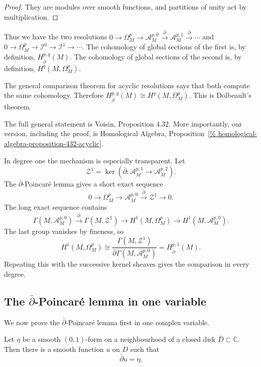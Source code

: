 \begin{proof}
They are modules over smooth functions, and
partitions of unity act by multiplication.
\end{proof}

Thus we have the two resolutions
$
0\longrightarrow\Omega^p_M
\longrightarrow\mathcal A^{p,0}_M
\xrightarrow{\bar\partial}
\mathcal A^{p,1}_M
\xrightarrow{\bar\partial}\cdots
$
and
$
0\longrightarrow\Omega^p_M
\longrightarrow\mathcal I^0
\longrightarrow\mathcal I^1
\longrightarrow\cdots.
$
The cohomology of global sections of the
first is, by definition,
$H^{p,q}_{\bar\partial}(M)$.
The cohomology of global sections of the
second is, by definition,
$H^q(M,\Omega^p_M)$.

The general comparison theorem for acyclic
resolutions says that both compute the same
cohomology. Therefore
$
H^{p,q}_{\bar\partial}(M)
\cong
H^q(M,\Omega^p_M).
$
This is Dolbeault's theorem.

The full general statement is Voisin,
Proposition 4.32. More importantly, our
version, including the proof, is Homological
Algebra, Proposition~\ref{%
homological-algebra-proposition-432-acyclic}.

In degree one the mechanism is especially
transparent. Let
$$
\mathcal Z^1
=
\ker\left(
\bar\partial:
\mathcal A^{p,1}_M
\to
\mathcal A^{p,2}_M
\right).
$$
The $\bar\partial$-Poincaré lemma gives a
short exact sequence
$$
0\longrightarrow\Omega^p_M
\longrightarrow\mathcal A^{p,0}_M
\xrightarrow{\bar\partial}
\mathcal Z^1
\longrightarrow0.
$$
The long exact sequence contains
$$
\Gamma(M,\mathcal A^{p,0}_M)
\xrightarrow{\bar\partial}
\Gamma(M,\mathcal Z^1)
\longrightarrow
H^1(M,\Omega^p_M)
\longrightarrow
H^1(M,\mathcal A^{p,0}_M).
$$
The last group vanishes by fineness, so
$$
H^1(M,\Omega^p_M)
\cong
\frac{\Gamma(M,\mathcal Z^1)}
{\bar\partial\Gamma(M,\mathcal A^{p,0}_M)}
=
H^{p,1}_{\bar\partial}(M).
$$
Repeating this with the successive kernel
sheaves gives the comparison in every
degree.

\subsection{The $\bar\partial$-Poincaré lemma
in one
variable}
\label{subsection-dbar-poincare-one-variable}

\medskip\noindent
We now prove the
$\bar\partial$-Poincaré lemma first in one
complex variable.

\begin{lemma}
\label{lemma-dbar-poincare-one-variable}
Let $\eta$ be a smooth $(0,1)$-form on a
neighbourhood of a closed disk
$\overline D\subset\mathbb C$. Then there is
a smooth function $u$ on $D$ such that
$$
\bar\partial u=\eta.
$$
\end{lemma}

